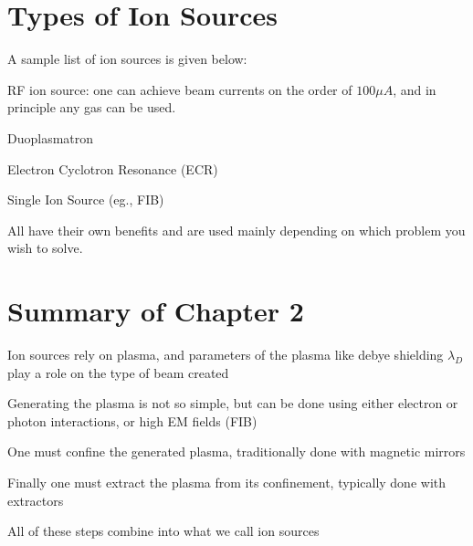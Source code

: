 \section{Types of Ion Sources}\label{sec:types-of-ion-sources}

A sample list of ion sources is given below:
\begin{myitemize}
	\item RF ion source: one can achieve beam currents on the order of $100 \mu A$, and in principle any gas can be used.
	\item Duoplasmatron
	\item Electron Cyclotron Resonance (ECR)
	\item Single Ion Source (eg., FIB)
\end{myitemize}
All have their own benefits and are used mainly depending on which problem you wish to solve.

\section{Summary of Chapter 2}\label{sec:summary-of-chapter-2}

\begin{myitemize}
	\item Ion sources rely on plasma, and parameters of the plasma like debye shielding $\lambda_D$ play a role on the type of beam created
	\item Generating the plasma is not so simple, but can be done using either electron or photon interactions, or high EM fields (FIB)
	\item One must confine the generated plasma, traditionally done with magnetic mirrors
	\item Finally one must extract the plasma from its confinement, typically done with extractors
	\item All of these steps combine into what we call ion sources
\end{myitemize}
